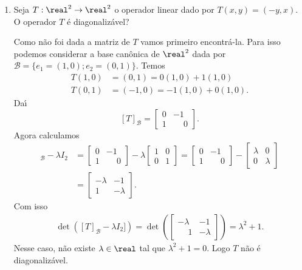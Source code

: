 \begin{exemplo}
    \begin{enumerate}[label={\arabic*})]
        \item Seja $T : \real^2 \to \real^2$ o operador linear dado por $T(x,y) = (-y,x)$. O operador $T$ é diagonalizável?
        \begin{solucao}
            Como não foi dada a matriz de $T$ vamos primeiro encontrá-la. Para isso podemos considerar a base can\^onica de $\real^2$ dada por $\mathcal{B} = \{e_1 = (1,0); e_2 = (0,1)\}$. Temos
            \begin{align}
                T(1,0) &= (0,1) = 0(1,0) + 1(1,0)\\
                T(0,1) &= (-1,0) = -1(1,0) + 0(1,0).
            \end{align}
            Da{\'\i}
            \[
                [T]_\mathcal{B} = \begin{bmatrix}0 & -1\\ 1 & \phantom{-}0\end{bmatrix}.
            \]
            Agora calculamos
            \begin{align*}
                [T]_\mathcal{B} - \lambda I_2 &= \begin{bmatrix}0 & -1\\ 1 & \phantom{-}0\end{bmatrix} - \lambda\begin{bmatrix}1 & 0\\0 & 1\end{bmatrix} = \begin{bmatrix}0 & -1\\ 1 & \phantom{-}0\end{bmatrix} - \begin{bmatrix}\lambda & 0\\0 & \lambda\end{bmatrix}\\ &= \begin{bmatrix}-\lambda & -1\\ 1 & -\lambda\end{bmatrix}.
            \end{align*}
            Com isso
            \begin{align*}
                \det([T]_\mathcal{B} - \lambda I_2]) = \det\left(\begin{bmatrix} -\lambda & -1\\\phantom{-}1 & -\lambda\end{bmatrix}\right) = \lambda^2 + 1.
            \end{align*}
            Nesse caso, não existe $\lambda \in \real$ tal que $\lambda^2 + 1 = 0$. Logo $T$ não é diagonalizável.
        \end{solucao}


\end{enumerate}
\end{exemplo}
